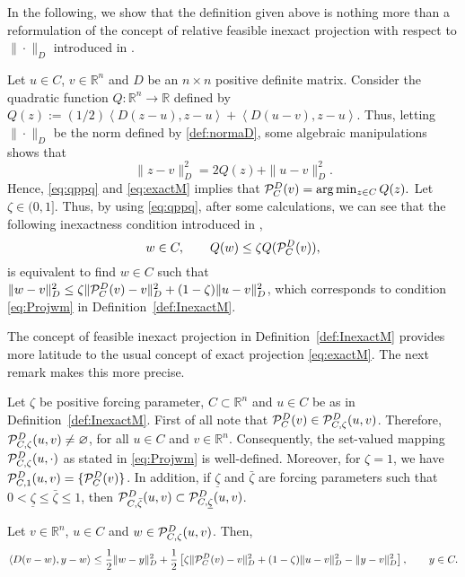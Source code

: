 In the following, we show that the definition given above is nothing more than a reformulation of the concept of  relative feasible inexact projection with respect to $\| \cdot \|_{D}$  introduced in  \cite{BirginMartinezRaydan2003}.
\begin{remark}
	Let $u\in C$, $v\in \mathbb{R}^n$ and  $D$ be   an $n\times n$ positive definite matrix. Consider the quadratic  function $Q: \mathbb{R}^n \to \mathbb{R}$ defined by $Q(z):=(1/2) \left\langle {D}(z-u),z-u\right\rangle +  \left \langle D(u-v), z-u \right\rangle$.
	Thus,  letting  $\| \cdot \|_{D}$  be  the norm  defined by \eqref{def:normaD},  some algebraic manipulations   shows that
	\begin{equation} \label{eq:qppq}
		\|z-v\|^2_{D}= 2Q(z) +\|u-v\|^2_{D}.
	\end{equation}
	Hence,  \eqref{eq:qppq}  and \eqref{eq:exactM}  implies  that    ${\cal P}_{C}^{D}(v)=\arg \min _{z\in C}Q(z).$
	Let $\zeta\in (0, 1]$. Thus, by using \eqref{eq:qppq},  after some calculations,  we can see that  the following inexactness condition  introduced in \cite{BirginMartinezRaydan2003},
	$$
		w\in C, \qquad Q(w)\leq \zeta Q ( {\cal P}_{C}^{D}(v)) ,
	$$
	is  equivalent to find  $w\in C$ such that $\|w-v\|_{D}^2\leq \zeta \| {\cal P}_{C}^{D}(v)-v\|_{D}^2+(1-\zeta)\|u-v\|_{D}^2$,  which corresponds to condition \eqref{eq:Projwm} in Definition~\ref{def:InexactM}.
\end{remark}
The  concept of  feasible inexact projection  in Definition~\ref{def:InexactM}  provides  more latitude to   the usual  concept  of exact projection \eqref{eq:exactM}.  The next   remark makes  this more precise.
\begin{remark}\label{rem: welldef}
	Let $\zeta$ be positive forcing parameter, $C\subset {\mathbb R}^n$ and $u\in C$ be as in Definition~\ref{def:InexactM}.  First of all note that  ${\cal P}_{C}^{D}( v) \in {\cal P}_{C,\zeta}^{D}(u, v)$. Therefore,  ${\cal P}_{C,\zeta}^{D}(u, v)\neq \varnothing$, for all $u\in C$ and $v\in {\mathbb R}^n$. Consequently, the set-valued mapping ${\cal P}_{C,\zeta}^{D}(u,  \cdot)$ as stated in \eqref{eq:Projwm} is well-defined.   Moreover,  for $\zeta=1$, we have ${\cal P}_{C,1}^{D}(u, v)=\{{\cal P}_{C}^{D}(v)\}$.
	In addition, if $\underline{\zeta}$ and $\bar{\zeta}$ are forcing parameters such that $0<\underline{\zeta}\leq \bar{\zeta}\leq 1$, then ${\cal P}_{C,\bar{\zeta}}^{D}(u, v) \subset {\cal P}_{C,\underline{\zeta}}^{D}(u, v)$.
\end{remark}
\begin{lemma} \label{pr:condm}
	Let $v \in {\mathbb R}^n$, $u \in C$ and $w\in {\cal P}_{C,\zeta}^{D}(u, v)$. Then, 
	$$
		\left\langle D(v-w), y-w\right\rangle \leq  \frac{1}{2} \|w-y\|_{D}^2 +   \frac{1}{2} \left[\zeta \| {\cal P}_{C}^{D}(v)-v\|_{D}^2+(1-\zeta)\|u-v\|_{D}^2 - \|y-v\|_{D}^2\right] ,   \qquad y \in C.
	$$
\end{lemma}
